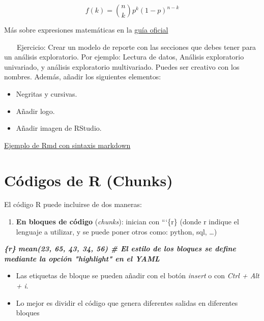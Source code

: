 \documentclass[
]{article}
\newenvironment{Shaded}{\begin{snugshade}}{\end{snugshade}}
\newcommand{\InformationTok}[1]{\textcolor[rgb]{0.56,0.35,0.01}{\textbf{\textit{#1}}}}
\providecommand{\tightlist}{%
  \setlength{\itemsep}{0pt}\setlength{\parskip}{0pt}}
\begin{document}
\[f(k) = {n \choose k} p^{k} (1-p)^{n-k}\]

Más sobre expresiones matemáticas en la
\href{https://bookdown.org/yihui/rmarkdown/markdown-syntax.html\#math-expressions}{guía
oficial}

👩‍💻 👨‍💻 Ejercicio: Crear un modelo de reporte con las secciones que
debes tener para un análisis exploratorio. Por ejemplo: Lectura de
datos, Análisis exploratorio univariado, y análisis exploratorio
multivariado. Puedes ser creativo con los nombres. Además, añadir los
siguientes elementos:

\begin{itemize}
\tightlist
\item
  Negritas y cursivas.
\item
  Añadir logo.
\item
  Añadir imagen de RStudio.
\end{itemize}

\href{ejemplos/ejemplo_markdown_sintax_guiaPrimerosPasos.Rmd}{Ejemplo de
Rmd con sintaxis markdown}

\hypertarget{cuxf3digos-de-r-chunks}{%
\section{Códigos de R (Chunks)}\label{cuxf3digos-de-r-chunks}}

El código R puede incluirse de dos maneras:

\begin{enumerate}
\def\labelenumi{\arabic{enumi}.}
\tightlist
\item
  \textbf{En bloques de código} (\emph{chunks}): inician con ```\{r\}
  (donde r indique el lenguaje a utilizar, y se puede poner otros como:
  python, sql, \ldots)
\end{enumerate}

\begin{Shaded}
\begin{Highlighting}[]
\InformationTok{\textasciigrave{}\textasciigrave{}\textasciigrave{}\{r\}}
\InformationTok{mean(23, 65, 43, 34, 56) \# El estilo de los bloques se define mediante la opción "highlight" en el YAML}
\InformationTok{\textasciigrave{}\textasciigrave{}\textasciigrave{}}
\end{Highlighting}
\end{Shaded}

\begin{itemize}
\tightlist
\item
  Las etiquetas de bloque se pueden añadir con el botón \emph{insert} o
  con \emph{Ctrl + Alt + i}.
\item
  Lo mejor es dividir el código que genera diferentes salidas en
  diferentes bloques
\end{itemize}
\end{document}
